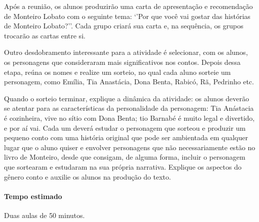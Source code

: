 \documentclass[11pt]{extarticle}
\begin{document}
Após a reunião, os alunos produzirão uma carta de apresentação e recomendação de Monteiro Lobato com o seguinte tema: ‘’Por que você vai gostar das histórias de Monteiro Lobato?’’. Cada grupo criará sua carta e, na sequência, os grupos trocarão as cartas entre si.

Outro desdobramento interessante para a atividade é selecionar, com os alunos, os personagens que consideraram mais significativos nos contos. 
Depois dessa etapa, reúna os nomes e realize um sorteio, no qual cada aluno sorteie um personagem, como Emília, Tia Anastácia, Dona Benta, Rabicó, Rã, Pedrinho etc.

Quando o sorteio terminar, explique a dinâmica da atividade: os alunos deverão se atentar para as características da personalidade da personagem: Tia Anástacia é cozinheira, vive no sítio com Dona Benta; tio Barnabé é muito legal e divertido, e por aí vai. 
Cada um deverá estudar o personagem que sorteou e produzir um pequeno conto com uma história original que pode ser ambientada em qualquer lugar que o aluno quiser e envolver personagens que não necessariamente estão no livro de Monteiro, desde que consigam, de alguma forma, incluir o personagem que sortearam e estudaram na sua própria narrativa. Explique os aspectos do gênero conto e auxilie os alunos na produção do texto.


\paragraph{Tempo estimado} Duas aulas de 50 minutos.
\end{document}

